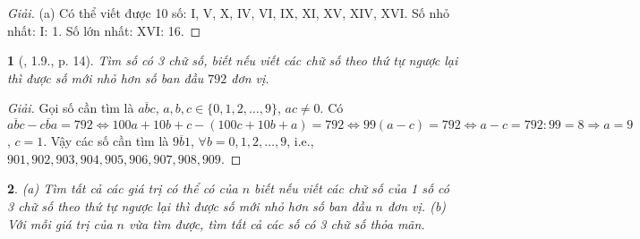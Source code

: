 \documentclass{article}
\newtheorem{baitoan}{}
\begin{document}
\begin{proof}[Giải]
	(a) Có thể viết được 10 số: I, V, X, IV, VI, IX, XI, XV, XIV, XVI. Số nhỏ nhất: I: 1. Số lớn nhất: XVI: 16.
\end{proof}

\begin{baitoan}[\cite{Binh_boi_duong_Toan_6_tap_1}, 1.9., p. 14]
	Tìm số có 3 chữ số, biết nếu viết các chữ số theo thứ tự ngược lại thì được số mới nhỏ hơn số ban đầu $792$ đơn vị.
\end{baitoan}

\begin{proof}[Giải]
	Gọi số cần tìm là $\overline{abc}$, $a,b,c\in\{0,1,2,\ldots,9\}$, $ac\ne0$. Có $\overline{abc} - \overline{cba} = 792\Leftrightarrow100a + 10b + c - (100c + 10b + a) = 792\Leftrightarrow99(a - c) = 792\Leftrightarrow a - c = 792:99 = 8\Rightarrow a = 9$, $c = 1$. Vậy các số cần tìm là $\overline{9b1}$, $\forall b = 0,1,2,\ldots,9$, i.e., $901,902,903,904,905,906,907,908,909$.
\end{proof}

\begin{baitoan}
	(a) Tìm tất cả các giá trị có thể có của $n$ biết nếu viết các chữ số của 1 số có 3 chữ số theo thứ tự ngược lại thì được số mới nhỏ hơn số ban đầu $n$ đơn vị. (b) Với mỗi giá trị của $n$ vừa tìm được, tìm tất cả các số có 3 chữ số thỏa mãn.
\end{baitoan}
\end{document}
